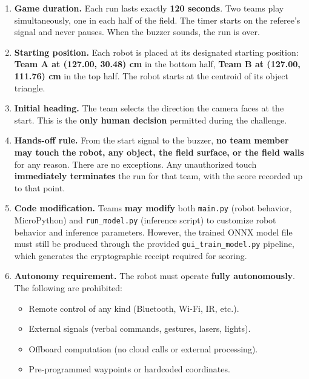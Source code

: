 \documentclass[a4]{article}
\begin{document}
\begin{enumerate}[label=\textbf{R\arabic*.}, leftmargin=2.5em]

\item \textbf{Game duration.} Each run lasts exactly \textbf{120 seconds}. Two teams play simultaneously, one in each half of the field. The timer starts on the referee's signal and never pauses. When the buzzer sounds, the run is over.

\item \textbf{Starting position.} Each robot is placed at its designated starting position: \textbf{Team A at (127.00, 30.48) cm} in the bottom half, \textbf{Team B at (127.00, 111.76) cm} in the top half. The robot starts at the centroid of its object triangle.

\item \textbf{Initial heading.} The team selects the direction the camera faces at the start. This is the \textbf{only human decision} permitted during the challenge.

\item \textbf{Hands-off rule.} From the start signal to the buzzer, \textbf{no team member may touch the robot, any object, the field surface, or the field walls} for any reason. There are no exceptions. Any unauthorized touch \textbf{immediately terminates} the run for that team, with the score recorded up to that point.

\item \textbf{Code modification.} Teams \textbf{may modify} both \texttt{main.py} (robot behavior, MicroPython) and \texttt{run\_model.py} (inference script) to customize robot behavior and inference parameters. However, the trained ONNX model file must still be produced through the provided \texttt{gui\_train\_model.py} pipeline, which generates the cryptographic receipt required for scoring.

\item \textbf{Autonomy requirement.} The robot must operate \textbf{fully autonomously}. The following are prohibited:
\begin{itemize}[nosep]
    \item Remote control of any kind (Bluetooth, Wi-Fi, IR, etc.).
    \item External signals (verbal commands, gestures, lasers, lights).
    \item Offboard computation (no cloud calls or external processing).
    \item Pre-programmed waypoints or hardcoded coordinates.
\end{itemize}


\end{enumerate}
\end{document}
